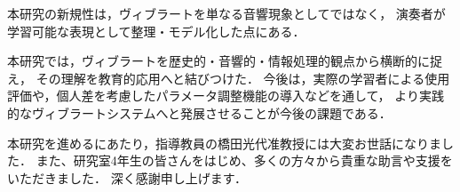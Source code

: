 本研究の新規性は，ヴィブラートを単なる音響現象としてではなく，
演奏者が学習可能な表現として整理・モデル化した点にある．

本研究では，ヴィブラートを歴史的・音響的・情報処理的観点から横断的に捉え，
その理解を教育的応用へと結びつけた．
今後は，実際の学習者による使用評価や，個人差を考慮したパラメータ調整機能の導入などを通して，
より実践的なヴィブラートシステムへと発展させることが今後の課題である．


\begin{acknowledgment}
	本研究を進めるにあたり，指導教員の橋田光代准教授には大変お世話になりました．
	また、研究室4年生の皆さんをはじめ、多くの方々から貴重な助言や支援をいただきました．
	深く感謝申し上げます．
\end{acknowledgment}

